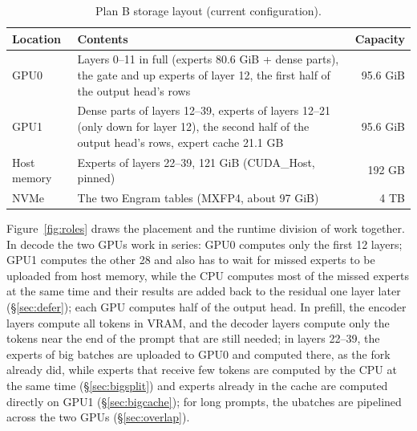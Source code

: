 \documentclass[11pt,a4paper]{article}
\begin{document}
\begin{table}[h]
  \centering
  \small
  \caption{Plan B storage layout (current configuration).}
  \label{tab:place}
  \begin{tabularx}{\textwidth}{@{}l X r@{}}
    \toprule
    Location & Contents & Capacity \\
    \midrule
    GPU0 & Layers 0--11 in full (experts 80.6 GiB + dense parts), the gate and up experts of layer 12, the first half of the output head's rows & 95.6 GiB \\
    GPU1 & Dense parts of layers 12--39, experts of layers 12--21 (only down for layer 12), the second half of the output head's rows, expert cache 21.1 GB & 95.6 GiB \\
    Host memory & Experts of layers 22--39, 121 GiB (CUDA\_Host, pinned) & 192 GB \\
    NVMe & The two Engram tables (MXFP4, about 97 GiB) & 4 TB \\
    \bottomrule
  \end{tabularx}
\end{table}

Figure~\ref{fig:roles} draws the placement and the runtime division of work together. In decode the two GPUs work in series: GPU0 computes only the first 12 layers; GPU1 computes the other 28 and also has to wait for missed experts to be uploaded from host memory, while the CPU computes most of the missed experts at the same time and their results are added back to the residual one layer later (\S\ref{sec:defer}); each GPU computes half of the output head. In prefill, the encoder layers compute all tokens in VRAM, and the decoder layers compute only the tokens near the end of the prompt that are still needed; in layers 22--39, the experts of big batches are uploaded to GPU0 and computed there, as the fork already did, while experts that receive few tokens are computed by the CPU at the same time (\S\ref{sec:bigsplit}) and experts already in the cache are computed directly on GPU1 (\S\ref{sec:bigcache}); for long prompts, the ubatches are pipelined across the two GPUs (\S\ref{sec:overlap}).
\end{document}

